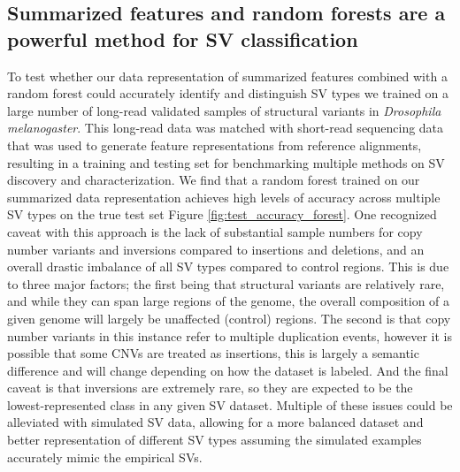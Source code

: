 \subsection{Summarized features and random forests are a powerful method for SV classification}

To test whether our data representation of summarized features combined with a random forest could accurately identify and distinguish SV types we trained on a large number of long-read validated samples of structural variants in \textit{Drosophila melanogaster}. This long-read data was matched with short-read sequencing data that was used to generate feature representations from reference alignments, resulting in a training and testing set for benchmarking multiple methods on SV discovery and characterization. We find that a random forest trained on our summarized data representation achieves high levels of accuracy across multiple SV types on the true test set Figure \ref{fig:test_accuracy_forest}. One recognized caveat with this approach is the lack of substantial sample numbers for copy number variants and inversions compared to insertions and deletions, and an overall drastic imbalance of all SV types compared to control regions. This is due to three major factors; the first being that structural variants are relatively rare, and while they can span large regions of the genome, the overall composition of a given genome will largely be unaffected (control) regions. The second is that copy number variants in this instance refer to multiple duplication events, however it is possible that some CNVs are treated as insertions, this is largely a semantic difference and will change depending on how the dataset is labeled. And the final caveat is that inversions are extremely rare, so they are expected to be the lowest-represented class in any given SV dataset. Multiple of these issues could be alleviated with simulated SV data, allowing for a more balanced dataset and better representation of different SV types assuming the simulated examples accurately mimic the empirical SVs.

